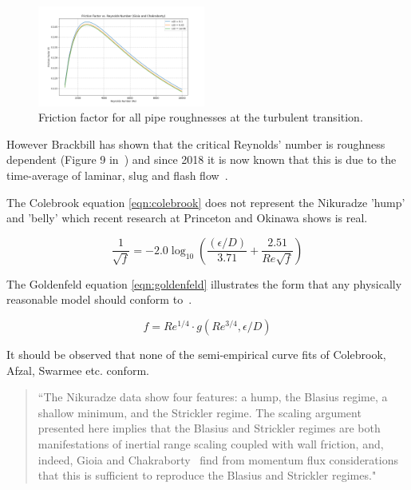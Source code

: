 \documentclass[5p]{elsarticle} %
\begin{document}
\begin{figure}[ht]
\centering
\includegraphics[width=0.49\textwidth]{gcff.png}
\caption{Friction factor for all pipe roughnesses at the turbulent transition.}
\label{fig:gioia}
\end{figure}

However  Brackbill has shown that the critical Reynolds' number is roughness dependent (Figure 9 in~\citep{Brackbill2007}) and since 2018 it is now known that this is due to the time-average of laminar, slug and flash flow~\cite{Cerbus2018}.

The Colebrook equation \ref{eqn:colebrook} does not represent the Nikuradze 'hump' and 'belly' which recent research at Princeton and Okinawa shows is real.

\begin{equation}
\label{eqn:colebrook}
\frac{1}{\sqrt{f}} = -2.0 \log_{10} \left( \frac{(\epsilon/D)}{3.71} + \frac{2.51}{Re\sqrt{f}} \right)
\end{equation}

The Goldenfeld equation \ref{eqn:goldenfeld} illustrates the form that any physically reasonable model should conform to~\cite{Goldenfeld2006}.

\begin{equation}
\label{eqn:goldenfeld}
f =   Re^{1/4} \cdot  g \left( Re^{3/4}, \epsilon/D  \right )
\end{equation}

It should be observed that none of the semi-empirical curve fits of Colebrook, Afzal, Swarmee etc. conform.
\begin{quote}
``The Nikuradze
data show four features: a hump, the Blasius regime, a
shallow minimum, and the Strickler regime. The scaling
argument presented here implies that the Blasius and
Strickler regimes are both manifestations of inertial range
scaling coupled with wall friction, and, indeed, Gioia and
Chakraborty~\citep{Gioia2006} find from momentum flux considerations that
this is sufficient to reproduce the Blasius and Strickler
regimes."~\cite{Goldenfeld2006}
\end{quote}
\end{document}
